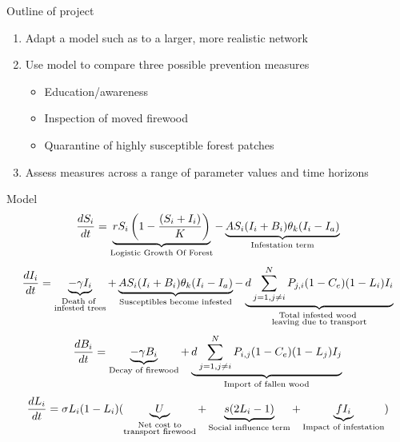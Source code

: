 \documentclass{beamer}
\begin{document}
\begin{frame}{Outline of project}
    \begin{enumerate}
    \item Adapt a model such as \citet{barlow2014modelling} to a larger, more realistic network
    \item Use model to compare three possible prevention measures
    \begin{itemize}
        \item Education/awareness
        \item Inspection of moved firewood
        \item Quarantine of highly susceptible forest patches
    \end{itemize}
    \item Assess measures across a range of parameter values and time horizons 
    \end{enumerate}
\end{frame}

\begin{frame}{Model}
    \footnotesize
    \begin{equation}
        \frac{d S_i}{dt} = \underbrace{ r S_i\left(1 - \frac{(S_i + I_i)}{K}\right)}_{\text{Logistic Growth Of Forest}} - \underbrace{A S_i (I_i+ B_i)\theta_k(I_i - I_a)}_{\text{Infestation term}}
        \protect \label{s_eqn}
        \end{equation}
        \begin{equation}
        \frac{d I_i}{dt} = \underbrace{-\gamma I_i}_{\substack{\text{Death of }\\\text{infested trees}}} + \underbrace{A S_i (I_i+ B_i)\theta_k(I_i - I_a)}_{\text{Susceptibles become infested}}- \underbrace{d\sum_{j = 1, j\neq i}^N P_{j,i} (1 - C_e) (1 - L_i)I_i}_{\substack{\text{Total infested wood }\\\text{leaving due to transport}}}
        \protect \label{i_eqn}
        \end{equation}
        \begin{equation}
        \frac{d B_i}{dt} = \underbrace{-\gamma B_i}_{\text{Decay of firewood}} + \underbrace{d\sum_{j = 1, j\neq i}^N P_{i,j} (1 - C_e) (1 - L_j)I_j}_{\text{Import of fallen wood}}
        \protect \label{b_eqn}
        \end{equation}
        \begin{equation}
        \frac{d L_i}{dt} = \sigma L_i (1 -L_i)(\underbrace{U}_{\substack{\text{Net cost to}\\\text{transport firewood}}} + \underbrace{s (2 L_i - 1)}_{\text{Social influence term}} + \underbrace{f I_i}_{\text{Impact of infestation}})  
        \protect \label{l_eqn}
    \end{equation}
        
\end{frame}
\end{document}
